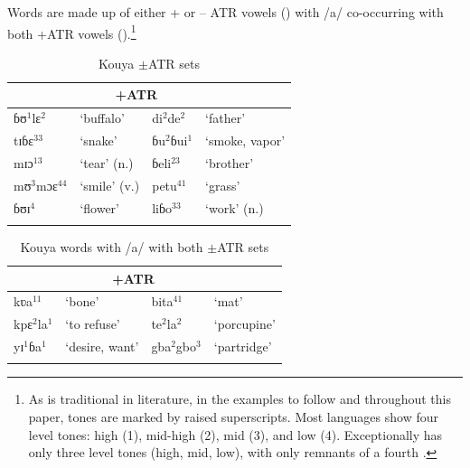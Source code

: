 \documentclass[output=paper
,newtxmath
,modfonts
,nonflat]{langsci/langscibook}
\begin{document}
 Words are made up of either + or – ATR vowels () with /a/ co-occurring with both +ATR vowels ().\footnote{As is traditional in  literature, in the examples to follow and throughout this paper, tones are marked by raised superscripts. Most  languages show four level tones: high (1), mid-high (2), mid (3), and low (4).  Exceptionally  has only three level tones (high, mid, low), with only remnants of a fourth  \citep{Gratrix1975}.} 

\begin{table} %

		\caption{Kouya $\pm$ATR sets}     \label{tab:zogbo:2a}
\begin{tabular}{llll}

\lsptoprule
\multicolumn{2}{c}{–ATR} & \multicolumn{2}{c}{+ATR}\\
\midrule
{ɓʊ}{$^1$}{l}ɛ$^2$ &     {‘buffalo’} & {di}$^2${de}$^2$ & {‘father’}\\

{t}ɪɓɛ$^{33}$  &  ‘snake’   &   ɓ{u}$^2$ɓui$^1$ & {‘smoke,  vapor’}\\

mɪɔ$^{13}$  &  ‘tear’ (n.) &    ɓeli$^{23}$  &  ‘brother’ \\

m{ʊ}{$^3$}{m}ɔɛ$^{44}$ & ‘smile’ (v.)  &  petu$^{41}$  &  ‘grass’ \\

ɓʊɪ$^4$ & ‘flower’  &  liɓo$^{33}$    & ‘work’ (n.) \\
\lspbottomrule
\end{tabular}
\end{table}



\begin{table}
\caption{Kouya words with /a/ with both $\pm$ATR sets}
\label{tab:zogbo:2b}
  
\begin{tabular}{llll}

\lsptoprule
\multicolumn{2}{c}{–ATR}     &     \multicolumn{2}{c}{+ATR}\\
\midrule
kʋa$^{11}$  &  ‘bone’   &   bita$^{41}$  &  ‘mat’\\

{kp}ɛ$^2${l}a$^1$ & {‘to refuse’}   &   te$^2$la$^2$  &  ‘porcupine’\\

  yɪ$^1$ɓa$^1$ &  ‘desire, want’ & {gb}a$^2${gb}o$^3$ & {‘partridge’}\\ 
  \lspbottomrule
\end{tabular}
\end{table}
\end{document}

